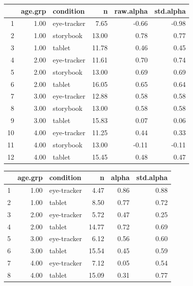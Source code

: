 \documentclass[man,noapacite]{apa2}
\begin{document}
\begin{table}[ht]
\centering
\begin{tabular}{rrlrrr}
  \hline
 & age.grp & condition & n & raw.alpha & std.alpha \\ 
  \hline
1 & 1.00 & eye-tracker & 7.65 & -0.66 & -0.98 \\ 
  2 & 1.00 & storybook & 13.00 & 0.78 & 0.77 \\ 
  3 & 1.00 & tablet & 11.78 & 0.46 & 0.45 \\ 
  4 & 2.00 & eye-tracker & 11.61 & 0.70 & 0.74 \\ 
  5 & 2.00 & storybook & 13.00 & 0.69 & 0.69 \\ 
  6 & 2.00 & tablet & 16.05 & 0.65 & 0.64 \\ 
  7 & 3.00 & eye-tracker & 12.88 & 0.58 & 0.58 \\ 
  8 & 3.00 & storybook & 13.00 & 0.58 & 0.58 \\ 
  9 & 3.00 & tablet & 15.83 & 0.07 & 0.06 \\ 
  10 & 4.00 & eye-tracker & 11.25 & 0.44 & 0.33 \\ 
  11 & 4.00 & storybook & 13.00 & -0.11 & -0.11 \\ 
  12 & 4.00 & tablet & 15.45 & 0.48 & 0.47 \\ 
   \hline
\end{tabular}
\end{table}

\begin{table}[ht]
\centering
\begin{tabular}{rrlrrr}
  \hline
 & age.grp & condition & n & alpha & std.alpha \\ 
  \hline
1 & 1.00 & eye-tracker & 4.47 & 0.86 & 0.88 \\ 
  2 & 1.00 & tablet & 8.50 & 0.77 & 0.72 \\ 
  3 & 2.00 & eye-tracker & 5.72 & 0.47 & 0.25 \\ 
  4 & 2.00 & tablet & 14.77 & 0.72 & 0.69 \\ 
  5 & 3.00 & eye-tracker & 6.12 & 0.56 & 0.60 \\ 
  6 & 3.00 & tablet & 15.54 & 0.45 & 0.59 \\ 
  7 & 4.00 & eye-tracker & 7.12 & 0.05 & 0.54 \\ 
  8 & 4.00 & tablet & 15.09 & 0.31 & 0.77 \\ 
   \hline
\end{tabular}
\end{table}
\end{document}
